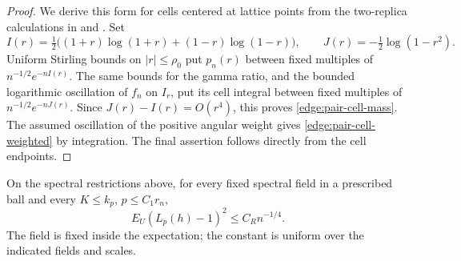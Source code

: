 \begin{proof}
We derive this form for cells centered at lattice points from the two-replica calculations in
\cite[Section~15.4, Equation~(15.10)]{CM} and
\cite[proof of Lemma~3.2]{FUA}.  Set
\[
 I(r)=\tfrac12\bigl((1+r)\log(1+r)+(1-r)\log(1-r)\bigr),
 \qquad J(r)=-\tfrac12\log(1-r^2).
\]
Uniform Stirling bounds on \(|r|\le\rho_0\) put \(p_n(r)\) between
fixed multiples of \(n^{-1/2}e^{-nI(r)}\).  The same bounds for the
gamma ratio, and the bounded logarithmic oscillation of \(f_n\) on
\(I_r\), put its cell integral between fixed multiples of
\(n^{-1/2}e^{-nJ(r)}\).  Since \(J(r)-I(r)=O(r^4)\), this proves
\eqref{edge:pair-cell-mass}.  The assumed oscillation of the positive
angular weight gives \eqref{edge:pair-cell-weighted} by integration.
The final assertion follows directly from the cell endpoints.
\end{proof}

\begin{lemma}
\label{edge:replica-comparison}
On the spectral restrictions above, for every fixed spectral field in
a prescribed ball and every \(K\le k_p\), \(p\le C_1r_n\),
\begin{equation}\label{edge:likelihood-second-moment}
 E_U(L_p(h)-1)^2\le C_Rn^{-1/4}.
\end{equation}
The field is fixed inside the expectation; the constant is uniform over
the indicated fields and scales.
\end{lemma}


